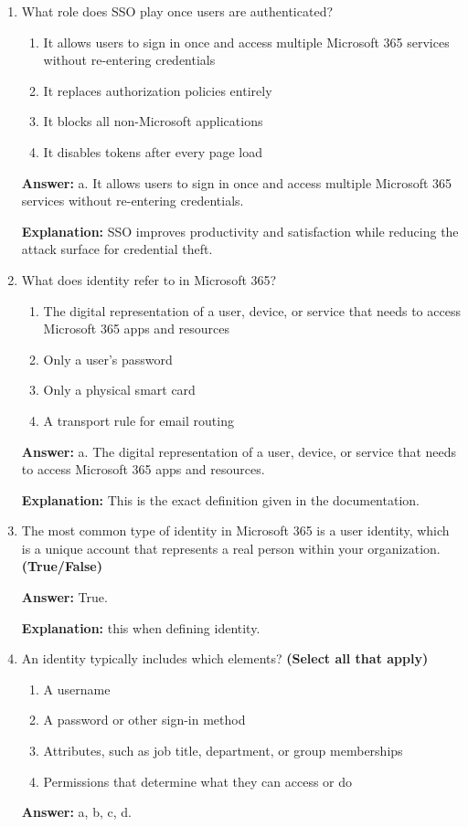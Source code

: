 \documentclass[10pt]{article}
\begin{document}
\begin{enumerate}[leftmargin=*]
\item What role does SSO play once users are authenticated?
\begin{enumerate}[label=\alph*., leftmargin=1.5em]
\item It allows users to sign in once and access multiple Microsoft 365 services without re-entering credentials
\item It replaces authorization policies entirely
\item It blocks all non-Microsoft applications
\item It disables tokens after every page load
\end{enumerate}
\textbf{Answer:} a. It allows users to sign in once and access multiple Microsoft 365 services without re-entering credentials.

\textbf{Explanation:} SSO improves productivity and satisfaction while reducing the attack surface for credential theft.

\item What does identity refer to in Microsoft 365?
\begin{enumerate}[label=\alph*., leftmargin=1.5em]
\item The digital representation of a user, device, or service that needs to access Microsoft 365 apps and resources
\item Only a user’s password
\item Only a physical smart card
\item A transport rule for email routing
\end{enumerate}
\textbf{Answer:} a. The digital representation of a user, device, or service that needs to access Microsoft 365 apps and resources.

\textbf{Explanation:} This is the exact definition given in the documentation.

\item The most common type of identity in Microsoft 365 is a user identity, which is a unique account that represents a real person within your organization. \textbf{(True/False)}

\textbf{Answer:} True.

\textbf{Explanation:} this when defining identity.

\item An identity typically includes which elements? \textbf{(Select all that apply)}
\begin{enumerate}[label=\alph*., leftmargin=1.5em]
\item A username
\item A password or other sign-in method
\item Attributes, such as job title, department, or group memberships
\item Permissions that determine what they can access or do
\end{enumerate}
\textbf{Answer:} a, b, c, d.


\end{enumerate}
\end{document}

